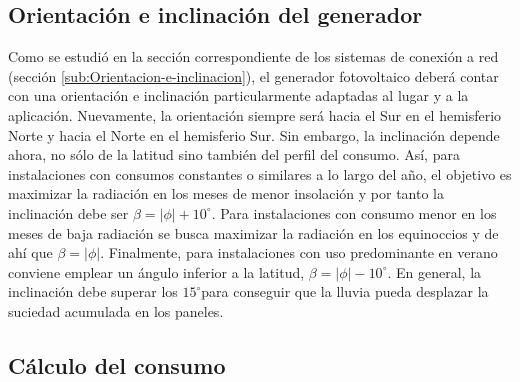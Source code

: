 \subsection{Orientación e inclinación del generador}

Como se estudió en la sección correspondiente de los sistemas de conexión
a red (sección \ref{sub:Orientacion-e-inclinacion}),
el generador fotovoltaico deberá contar con una orientación e inclinación
particularmente adaptadas al lugar y a la aplicación. Nuevamente,
la orientación siempre será hacia el Sur en el hemisferio Norte y
hacia el Norte en el hemisferio Sur. Sin embargo, la inclinación depende
ahora, no sólo de la latitud sino también del perfil del consumo.
Así, para instalaciones con consumos constantes o similares a lo largo
del año, el objetivo es maximizar la radiación en los meses de menor
insolación y por tanto la inclinación debe ser $\beta=|\phi|+10^{\circ}$.
Para instalaciones con consumo menor en los meses de baja radiación
se busca maximizar la radiación en los equinoccios y de ahí que $\beta=|\phi|$.
Finalmente, para instalaciones con uso predominante en verano conviene
emplear un ángulo inferior a la latitud, $\beta=|\phi|-10^{\circ}$.
En general, la inclinación debe superar los $15^{\circ}$para conseguir
que la lluvia pueda desplazar la suciedad acumulada en los paneles.


\subsection{Cálculo del consumo\label{sub:Estimacion-del-consumo}}


